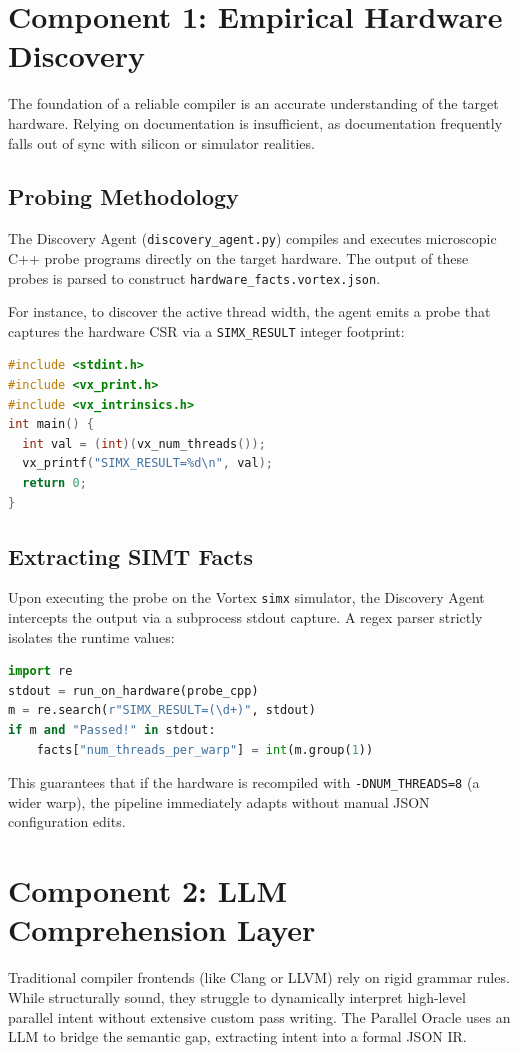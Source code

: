 \documentclass[10pt, conference, compsocconf]{IEEEtran}
\begin{document}
\section{Component 1: Empirical Hardware Discovery}
The foundation of a reliable compiler is an accurate understanding of the target hardware. Relying on documentation is insufficient, as documentation frequently falls out of sync with silicon or simulator realities. 

\subsection{Probing Methodology}
The Discovery Agent (\texttt{discovery\_agent.py}) compiles and executes microscopic C++ probe programs directly on the target hardware. The output of these probes is parsed to construct \texttt{hardware\_facts.vortex.json}.

For instance, to discover the active thread width, the agent emits a probe that captures the hardware CSR via a \texttt{SIMX\_RESULT} integer footprint:
\begin{lstlisting}[language=C++]
#include <stdint.h>
#include <vx_print.h>
#include <vx_intrinsics.h>
int main() {
  int val = (int)(vx_num_threads());
  vx_printf("SIMX_RESULT=%d\n", val);
  return 0;
}
\end{lstlisting}

\subsection{Extracting SIMT Facts}
Upon executing the probe on the Vortex \texttt{simx} simulator, the Discovery Agent intercepts the output via a subprocess stdout capture. A regex parser strictly isolates the runtime values:
\begin{lstlisting}[language=Python]
import re
stdout = run_on_hardware(probe_cpp)
m = re.search(r"SIMX_RESULT=(\d+)", stdout)
if m and "Passed!" in stdout:
    facts["num_threads_per_warp"] = int(m.group(1))
\end{lstlisting}

This guarantees that if the hardware is recompiled with \texttt{-DNUM\_THREADS=8} (a wider warp), the pipeline immediately adapts without manual JSON configuration edits.

\section{Component 2: LLM Comprehension Layer}
Traditional compiler frontends (like Clang or LLVM) rely on rigid grammar rules. While structurally sound, they struggle to dynamically interpret high-level parallel intent without extensive custom pass writing. The Parallel Oracle uses an LLM to bridge the semantic gap, extracting intent into a formal JSON IR.
\end{document}
